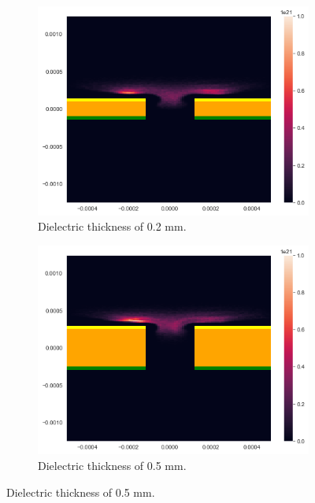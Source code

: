 \begin{figure}
    \centering
    \begin{subfigure}[b]{0.475\textwidth}
        \centering
        \includegraphics[width=\textwidth]{chapter_4/figures/SSR_dielectric_1.png}
        \caption[]%
        {{\small Dielectric thickness of 0.2 mm.}}    
        \label{fig:SSR_dielectric_0.2mm}
    \end{subfigure}
    \hfill
    \begin{subfigure}[b]{0.475\textwidth}  
        \centering 
        \includegraphics[width=\textwidth]{chapter_4/figures/SSR_dielectric_2.png}
        \caption[]%
        {{\small  Dielectric thickness of 0.5 mm.}}    

\end{subfigure}
\end{figure}
